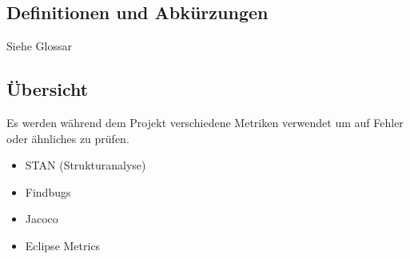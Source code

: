 \documentclass[11pt]{scrartcl}
\begin{document}
\subsection{Definitionen und Abkürzungen}
Siehe Glossar
\subsection{Übersicht}
Es werden während dem Projekt verschiedene Metriken verwendet
um auf Fehler oder ähnliches zu prüfen.
\begin{itemize}
  \item STAN (Strukturanalyse)
  \item Findbugs
  \item Jacoco
  \item Eclipse Metrics
\end{itemize}
\newpage
\end{document}

